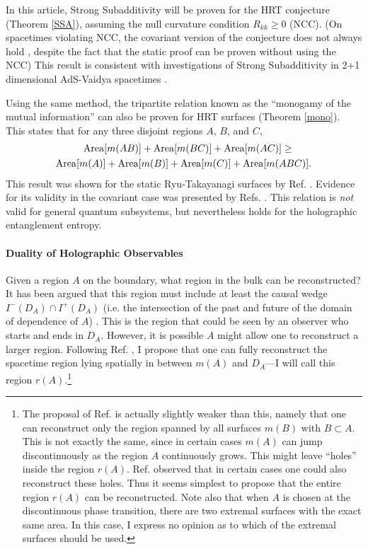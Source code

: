 \documentclass{article}
\begin{document}
In this article, Strong Subadditivity will be proven for the HRT conjecture (Theorem \ref{SSA}), assuming the null curvature condition $R_{kk} \ge 0$ (NCC).  (On spacetimes violating NCC, the covariant version of the conjecture does not always hold \cite{AT11,CHH12}, despite the fact that the static proof can be proven without using the NCC)  This result is consistent with investigations of Strong Subadditivity in 2+1 dimensional AdS-Vaidya spacetimes \cite{AT11,CHH12}.

Using the same method, the tripartite relation known as the ``monogamy of the mutual information'' can also be proven for HRT surfaces (Theorem \ref{mono}).  This states that for any three disjoint regions $A$, $B$, and $C$,
\begin{align}
\mathrm{Area}[m(AB)] + \mathrm{Area}[m(BC)] + \mathrm{Area}[m(AC)] \ge \phantom{Mn} \notag \\ 
\mathrm{Area}[m(A)] + \mathrm{Area}[m(B)] + \mathrm{Area}[m(C)]  + \mathrm{Area}[m(ABC)].
\end{align}
This result was shown for the static Ryu-Takayanagi surfaces by Ref. \cite{HHM11}.  Evidence for its validity in the covariant case was presented by Refs. \cite{AT11,BBCCG11}.  This relation is \emph{not} valid for general quantum subsystems, but nevertheless holds for the holographic entanglement entropy.

\paragraph{Duality of Holographic Observables}
Given a region $A$ on the boundary, what region in the bulk can be reconstructed?  It has been argued that this region must include at least the causal wedge $I^-(D_A) \cap I^+(D_A)$ (i.e. the intersection of the past and future of the domain of dependence of $A$) \cite{HR12, CKNR12, BLR12}.  This is the region that could be seen by an observer who starts and ends in $D_A$.  However, it is possible $A$ might allow one to reconstruct a larger region.  Following Ref. \cite{CKNR12}, I propose that one can fully reconstruct the spacetime region lying spatially in between $m(A)$ and $D_A$---I will call this region $r(A)$.\footnote{The proposal of Ref. \cite{CKNR12} is actually slightly weaker than this, namely that one can reconstruct only the region spanned by all surfaces $m(B)$ with $B \subset A$.  This is not exactly the same, since in certain cases $m(A)$ can jump discontinuously as the region $A$ continuously grows.  This might leave ``holes'' inside the region $r(A)$.  Ref. \cite{CKNR12} observed that in certain cases one could also reconstruct these holes.  Thus it seems simplest to propose that the entire region $r(A)$ can be reconstructed.  Note also that when $A$ is chosen at the discontinuous phase transition, there are two extremal surfaces with the exact same area.  In this case, I express no opinion as to which of the extremal surfaces should be used.}
\end{document}
